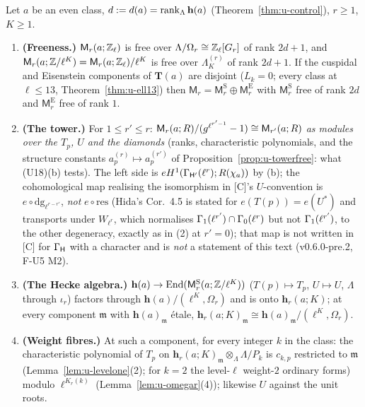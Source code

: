\documentclass[11pt]{article}
\newcommand{\Iw}{\Lambda}                         %
\newcommand{\hcusp}{\mathbf{h}}                   %
\newcommand{\Tu}{\mathbf{T}}                      %
\newcommand{\Pk}[1]{P_{#1}}                       %
\newcommand{\Eis}{\mathrm{E}}
\newcommand{\cusp}{\mathrm{S}}
\newcommand{\Zl}{\Z_\ell}
\newcommand{\Om}[1]{\Omega_{#1}}                      %
\newcommand{\IwT}[2]{\Iw^{(#2)}_{#1}}                 %
\begin{document}
\begin{theorem}\label{thm:u-towercontrol}
Let $a$ be an even class, $d:=d(a)=\rank_\Iw\hcusp(a)$ (Theorem~\ref{thm:u-control}), $r\ge1$, $K\ge1$.
\begin{enumerate}
\item \textbf{(Freeness.)} $\mathsf M_r(a;\Zl)$ is free over $\Iw/\Om r\cong\Zl[G_r]$ of rank $2d+1$, and $\mathsf M_r(a;\Z/\ell^{K})=\mathsf M_r(a;\Zl)/\ell^{K}$ is free over $\IwT Kr$ of rank $2d+1$.
  If the cuspidal and Eisenstein components of $\Tu(a)$ are disjoint ($L_k=0$; every class at $\ell\le13$, Theorem~\ref{thm:u-ell13}) then $\mathsf M_r=\mathsf M^{\cusp}_r\oplus\mathsf M^{\Eis}_r$
  with $\mathsf M^{\cusp}_r$ free of rank $2d$ and $\mathsf M^{\Eis}_r$ free of rank $1$.
\item \textbf{(The tower.)} For $1\le r'\le r$: $\mathsf M_r(a;R)/(g^{\ell^{r'-1}}-1)\cong\mathsf M_{r'}(a;R)$ \emph{as modules over the $T_p$, $U$ and the diamonds} (ranks, characteristic
  polynomials, and the structure constants $a^{(r)}_p\mapsto a^{(r')}_p$ of Proposition~\ref{prop:u-towerfree}: what (U18)(b) tests). The left side is $eH^{1}(\Gamma_{\mathsf H'}(\ell^{r});R(\chi_a))$ by
  (b); the cohomological map realising the isomorphism in [C]'s $U$-convention is $e\circ\mathrm{dg}_{\ell^{r-r'}}$, \emph{not} $e\circ\mathrm{res}$ (Hida's Cor.~4.5 is stated for
  $e(T(p))=e(U^{\ast})$ and transports under $W_{\ell^{r}}$, which normalises $\Gamma_1(\ell^{r'})\cap\Gamma_0(\ell^{r})$ but not $\Gamma_1(\ell^{r'})$, to the other degeneracy, exactly as in
  (2) at $r'=0$); that map is not written in [C] for $\Gamma_{\mathsf H}$ with a character and is \emph{not} a statement of this text (v0.6.0-pre.2, F-U5 M2).
\item \textbf{(The Hecke algebra.)} $\hcusp(a)\to\End(\mathsf M^{\cusp}_r(a;\Z/\ell^{K}))$ ($T(p)\mapsto T_p$, $U\mapsto U$, $\Iw$ through $\iota_r$) factors through
  $\hcusp(a)/(\ell^{K},\Om r)$ and is onto $\hcusp_r(a;K)$; at every component $\mathfrak m$ with $\hcusp(a)_{\mathfrak m}$ étale, $\hcusp_r(a;K)_{\mathfrak m}\cong\hcusp(a)_{\mathfrak m}/(\ell^{K},\Om r)$.
\item \textbf{(Weight fibres.)} At such a component, for every integer $k$ in the class: the characteristic polynomial of $T_p$ on $\hcusp_r(a;K)_{\mathfrak m}\otimes_\Iw\Iw/\Pk k$ is $c_{k,p}$ restricted
  to $\mathfrak m$ (Lemma~\ref{lem:u-levelone}(2); for $k=2$ the level-$\ell$ weight-$2$ ordinary forms) modulo $\ell^{K_r(k)}$ (Lemma~\ref{lem:u-omegar}(4)); likewise $U$ against the unit roots.

\end{enumerate}
\end{theorem}
\end{document}
